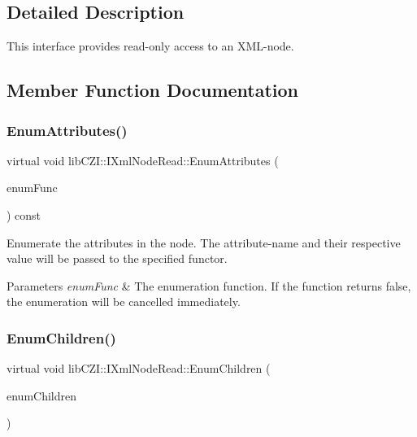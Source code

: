 \subsection{Detailed Description}
This interface provides read-\/only access to an X\+M\+L-\/node. 

\subsection{Member Function Documentation}
\mbox{\label{classlib_c_z_i_1_1_i_xml_node_read_afe7294913f033998c7a0bb695d795c0f}} 
\subsubsection{\texorpdfstring{Enum\+Attributes()}{EnumAttributes()}}
{\footnotesize\ttfamily virtual void lib\+C\+Z\+I\+::\+I\+Xml\+Node\+Read\+::\+Enum\+Attributes (\begin{DoxyParamCaption}\item[{const std\+::function$<$ bool(const std\+::wstring \&attrib\+Name, const std\+::wstring \&attrib\+Value)$>$ \&}]{enum\+Func }\end{DoxyParamCaption}) const\hspace{0.3cm}{\ttfamily [pure virtual]}}

Enumerate the attributes in the node. The attribute-\/name and their respective value will be passed to the specified functor.


\begin{DoxyParams}{Parameters}
{\em enum\+Func} & The enumeration function. If the function returns false, the enumeration will be cancelled immediately. \\
\hline
\end{DoxyParams}
\mbox{\label{classlib_c_z_i_1_1_i_xml_node_read_a70385059cfda44a6f2d590a9a8d6ac3e}} 
\subsubsection{\texorpdfstring{Enum\+Children()}{EnumChildren()}}
{\footnotesize\ttfamily virtual void lib\+C\+Z\+I\+::\+I\+Xml\+Node\+Read\+::\+Enum\+Children (\begin{DoxyParamCaption}\item[{std\+::function$<$ bool(std\+::shared\+\_\+ptr$<$ \hyperlink{classlib_c_z_i_1_1_i_xml_node_read}{I\+Xml\+Node\+Read} $>$)$>$}]{enum\+Children }\end{DoxyParamCaption})\hspace{0.3cm}{\ttfamily [pure virtual]}}


